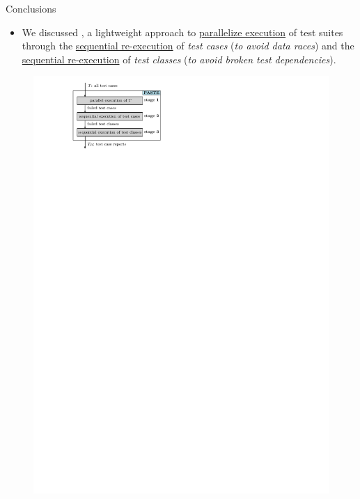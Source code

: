 \documentclass{beamer}
\begin{document}
\begin{frame}{Conclusions}
\begin{itemize}
	\item{\footnotesize We discussed {\rsm \textbf{\tname{}}}, a lightweight approach to {\rsm \underline{parallelize execution}} of test suites through the {\rsm \underline{sequential re-execution} of \textit{test cases}} (\textit{to avoid data races}) and the {\rsm \underline{sequential re-execution} of \textit{test classes}} (\textit{to avoid broken test dependencies}).}
\end{itemize}
\begin{center}
\begin{figure}[!htb]
\centering
\begin{minipage}{0.475\textwidth}
	\centering
	\includegraphics[width=\linewidth]{images/soundy.pdf}	
\end{minipage}%

\end{figure}
\end{center}
\end{frame}
\end{document}
